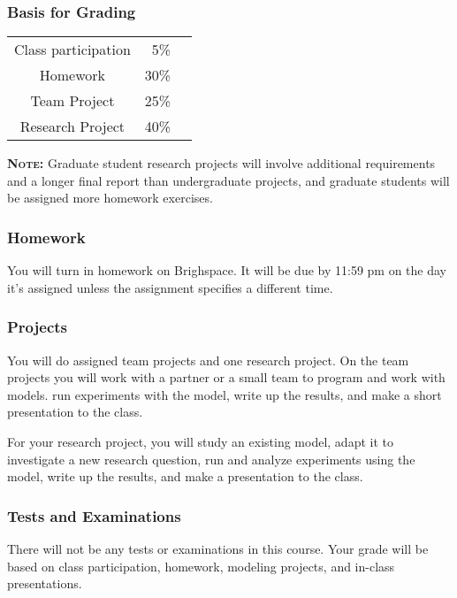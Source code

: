 \documentclass[11pt,twoside]{jgsyllabus}\usepackage[]{graphicx}\usepackage[]{xcolor}
\begin{document}
\subsubsection[Grading]{Basis for Grading}
\begin{center}
	\begin{tabular}[t]{crr}
		Class participation & 5\% &\\
		Homework & 30\% &\\
		Team Project & 25\% &\\
		Research Project & 40\% &
	\end{tabular}
\end{center}

\textbf{\scshape Note:} Graduate student research projects will involve
additional requirements and a longer final report than undergraduate projects,
and graduate students will be assigned more homework exercises.

\subsubsection{Homework}
You will turn in homework on Brighspace. It will be due by 11:59 pm on the day
it's assigned unless the assignment specifies a different time.
%
\subsubsection{Projects}
You will do assigned team projects and one research project.
On the team projects you will work with a partner or a small team to program
and work with models.
run experiments with the model, write up the results, and make a short
presentation to the class.

For your research project, you will study an existing model, adapt it to
investigate a new research question, run and analyze experiments using the
model, write up the results, and make a presentation to the class.

\subsubsection{Tests and Examinations}
There will not be any tests or examinations in this course. Your grade will be
based on class participation, homework, modeling projects, and in-class
presentations.
\end{document}
